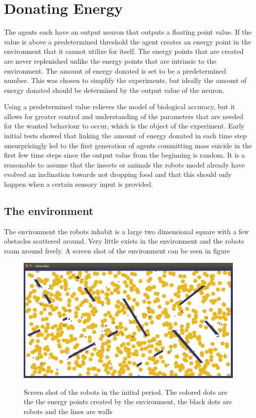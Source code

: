 \documentclass[a4paper]{book}
\begin{document}
\section{Donating Energy}
The agents each have an output neuron that outputs a floating point value. If the value is above a predetermined threshold the agent creates an energy point in the environment that 
it cannot utilize for itself. The energy points that are created are never replenished unlike the energy points that are intrinsic to the environment. The amount of energy donated is set to be a predetermined number. This was chosen to simplify the experiments, but ideally the amount of energy donated should be determined by the output value of the neuron.

Using a predetermined value relieves the model of biological accuracy, but it allows for greater control and understanding of the parameters 
that are needed for the wanted behaviour to occur, which is the object of the experiment. Early initial tests showed that linking the amount of energy donated in each time step unsurprisingly 
led to the first generation of agents committing mass suicide in the first few time steps since the output value from the beginning is random. It is a reasonable to assume that the insects or
animals the robots model already have evolved an inclination towards not dropping food and that this should only happen when a certain sensory input is provided.   

\subsection{The environment}
The environment the robots inhabit is a large two dimensional square with a few obstacles scattered around. 
Very little exists in the environment and the robots roam around freely.
A screen shot of the environment can be seen in figure %

  
\begin{figure}[H]
\includegraphics[width=\textwidth]{misc/initialPeriod.png}
\label{fig:initialPeriod}
\caption{Screen shot of the robots in the initial period. The colored dots are the the energy points created by the environment, the black dots are robots and the lines are walls}
\end{figure}
\end{document}
